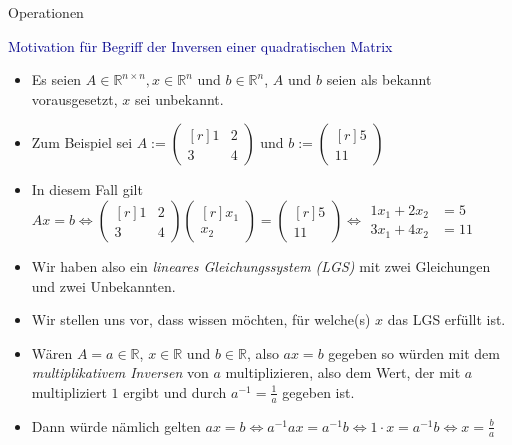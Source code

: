 \documentclass[
  8pt,
  ignorenonframetext,
]{beamer}
\providecommand{\tightlist}{%
  \setlength{\itemsep}{0pt}\setlength{\parskip}{0pt}}
\begin{document}
\begin{frame}{Operationen}
\protect\hypertarget{operationen-22}{}
\small

\textcolor{darkblue}{Motivation für Begriff der Inversen einer quadratischen Matrix}
 \footnotesize

\begin{itemize}
\tightlist
\item
  Es seien \(A\in \mathbb{R}^{n \times n}, x \in \mathbb{R}^n\) und
  \(b \in \mathbb{R}^n\), \(A\) und \(b\) seien als bekannt
  vorausgesetzt, \(x\) sei unbekannt. 
\item
  Zum Beispiel sei
  \(A := \begin{pmatrix*}[r] 1 & 2 \\ 3 & 4 \end{pmatrix*}\) und
  \(b := \begin{pmatrix*}[r] 5 \\ 11 \end{pmatrix*}\)
\item
  In diesem Fall gilt
  \(Ax = b \Leftrightarrow \begin{pmatrix*}[r] 1 & 2 \\ 3 & 4 \end{pmatrix*} \begin{pmatrix*}[r] x_1 \\ x_2 \end{pmatrix*} = \begin{pmatrix*}[r] 5 \\ 11 \end{pmatrix*} \Leftrightarrow \begin{matrix} 1x_1 + 2x_2 & = 5 \\ 3x_1 + 4x_2 & = 11 \end{matrix}\)
\item
  Wir haben also ein \emph{lineares Gleichungssystem (LGS)} mit zwei
  Gleichungen und zwei Unbekannten.
\item
  Wir stellen uns vor, dass wissen möchten, für welche(s) \(x\) das LGS
  erfüllt ist.
\item
  Wären \(A = a \in \mathbb{R}\), \(x \in \mathbb{R}\) und
  \(b \in \mathbb{R}\), also \(ax = b\) gegeben so würden mit dem
  \emph{multiplikativem Inversen} von \(a\) multiplizieren, also dem
  Wert, der mit \(a\) multipliziert \(1\) ergibt und durch
  \(a^{-1} = \frac{1}{a}\) gegeben ist.
\item
  Dann würde nämlich gelten
  \(ax = b \Leftrightarrow a^{-1}ax = a^{-1}b \Leftrightarrow 1 \cdot x = a^{-1}b \Leftrightarrow x = \frac{b}{a}\)

\end{itemize}
\end{frame}
\end{document}

